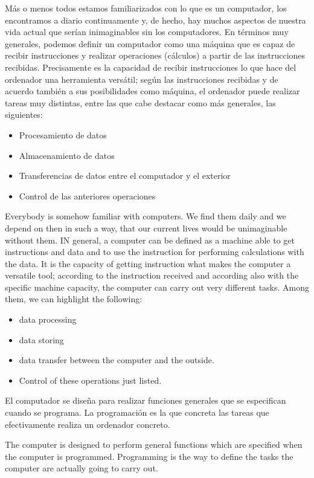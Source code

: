\begin{paracol}{2}
Más o menos todos estamos familiarizados con lo que es un computador, los encontramos a diario continuamente  y, de hecho, hay muchos aspectos de nuestra vida actual que serían inimaginables sin los computadores.  En términos muy generales, podemos definir un computador como una máquina que es capaz de recibir instrucciones y realizar operaciones (cálculos) a partir de las instrucciones recibidas. Precisamente es la capacidad de recibir instrucciones lo que hace del ordenador una herramienta versátil; según las instrucciones recibidas y de acuerdo también a sus posibilidades como máquina,  el ordenador puede realizar tareas muy distintas, entre las que cabe destacar como más generales, las siguientes:
\begin{itemize}
\item Procesamiento de datos 
\item Almacenamiento de datos
\item Transferencias de datos entre el computador y el exterior
\item Control de las anteriores operaciones
\end{itemize}

\switchcolumn
Everybody is somehow familiar with computers. We find them daily and we depend on then in such a way, that our current lives would be unimaginable without them. IN general, a computer can be defined as a machine able to get instructions and data and to use the instruction for performing calculations with the data. It is the capacity of getting instruction what makes the computer a versatile tool; according to the instruction received and according also with the specific machine capacity, the computer can carry out very different tasks. Among them, we can highlight the following:
\begin{itemize}
\item data processing
\item data storing
\item data transfer between the computer and the outside.
\item Control of these operations just listed.
\end{itemize}    

\switchcolumn
El computador se diseña para realizar funciones generales que se especifican cuando se programa. La programación es la que concreta las tareas que efectivamente realiza un ordenador concreto.

\switchcolumn
The computer is designed to perform general functions which are specified when the computer is programmed. Programming is the way to define the tasks the computer are actually going to carry out. 

\end{paracol}
 


